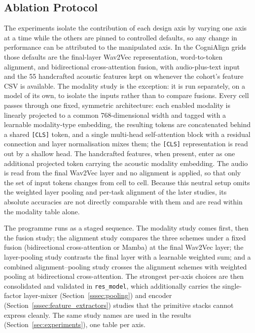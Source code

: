 \documentclass[a4paper,12pt]{article}
\begin{document}
\subsection{Ablation Protocol}
\label{ssec:ablation_protocol}

The experiments isolate the contribution of each design axis by varying one axis at a time while the others are pinned to controlled defaults, so any change in performance can be attributed to the manipulated axis. In the CogniAlign grids those defaults are the final-layer Wav2Vec representation, word-to-token alignment, and bidirectional cross-attention fusion, with audio-plus-text input and the 55 handcrafted acoustic features kept on whenever the cohort's feature CSV is available. The modality study is the exception: it is run separately, on a model of its own, to isolate the inputs rather than to compare fusions. Every cell passes through one fixed, symmetric architecture: each enabled modality is linearly projected to a common 768-dimensional width and tagged with a learnable modality-type embedding, the resulting tokens are concatenated behind a shared \texttt{[CLS]} token, and a single multi-head self-attention block with a residual connection and layer normalisation mixes them; the \texttt{[CLS]} representation is read out by a shallow head. The handcrafted features, when present, enter as one additional projected token carrying the acoustic modality embedding. The audio is read from the final Wav2Vec layer and no alignment is applied, so that only the set of input tokens changes from cell to cell. Because this neutral setup omits the weighted layer pooling and per-task alignment of the later studies, its absolute accuracies are not directly comparable with them and are read within the modality table alone.

The programme runs as a staged sequence. The modality study comes first, then the fusion study; the alignment study compares the three schemes under a fixed fusion (bidirectional cross-attention or Mamba) at the final Wav2Vec layer; the layer-pooling study contrasts the final layer with a learnable weighted sum; and a combined alignment--pooling study crosses the alignment schemes with weighted pooling at bidirectional cross-attention. The strongest per-axis choices are then consolidated and validated in \texttt{res\_model}, which additionally carries the single-factor layer-mixer (Section~\ref{sssec:pooling}) and encoder (Section~\ref{sssec:feature_extractors}) studies that the primitive stacks cannot express cleanly. The same study names are used in the results (Section~\ref{sec:experiments}), one table per axis.
\end{document}
